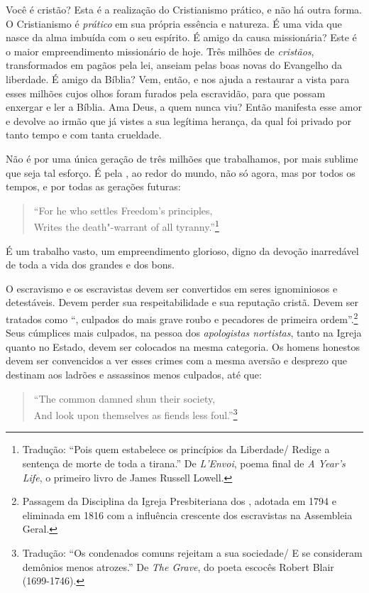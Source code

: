 Você é cristão? Esta é a realização do Cristianismo prático, e não há
outra forma. O Cristianismo é \emph{prático} em sua própria essência e
natureza. É uma vida que nasce da alma imbuída com o seu espírito. É
amigo da causa missionária? Este é o maior empreendimento missionário de
hoje. Três milhões de \emph{cristãos}, transformados em pagãos pela lei,
anseiam pelas boas novas do Evangelho da liberdade. É amigo da Bíblia?
Vem, então, e nos ajuda a restaurar a vista para esses milhões cujos
olhos foram furados pela escravidão, para que possam enxergar e ler a
Bíblia. Ama Deus, a quem nunca viu? Então manifesta esse amor e devolve
ao irmão que já vistes a sua legítima herança, da qual foi privado por
tanto tempo e com tanta crueldade.

Não é por uma única geração de três milhões que trabalhamos, por mais
sublime que seja tal esforço. É pela , ao redor do mundo, não
só agora, mas por todos os tempos, e por todas as gerações futuras:

\begin{verse}
``For he who settles Freedom's principles,\\
Writes the death"-warrant of all tyranny.''\footnote{Tradução: ``Pois quem estabelece os princípios da Liberdade/ Redige a sentença de morte
de toda a tirana.'' De \emph{L'Envoi}, poema final de \emph{A
  Year's Life}, o primeiro livro de James Russell Lowell.}
\end{verse}

É um trabalho vasto, um empreendimento glorioso, digno da devoção
inarredável de toda a vida dos grandes e dos bons.

O escravismo e os escravistas devem ser convertidos em seres
ignominiosos e detestáveis. Devem perder sua respeitabilidade e sua
reputação cristã. Devem ser tratados como ``, culpados
do mais grave roubo e pecadores de primeira ordem''.\footnote{Passagem da
  Disciplina da Igreja Presbiteriana dos , adotada em 1794 e
  eliminada em 1816 com a influência crescente dos escravistas na
  Assembleia Geral.} Seus cúmplices mais culpados, na pessoa dos
\emph{apologistas nortistas}, tanto na Igreja quanto no Estado, devem
ser colocados na mesma categoria. Os homens honestos devem ser
convencidos a ver esses crimes com a mesma aversão e desprezo que
destinam aos ladrões e assassinos menos culpados, até que:

\begin{verse}
``The common damned shun their society,\\
And look upon themselves as fiends less \qb{}foul.''\footnote{Tradução: ``Os condenados comuns rejeitam a sua sociedade/ E se consideram demônios menos atrozes.'' De \emph{The Grave}, do poeta
  escocês Robert Blair (1699-1746).}
\end{verse}

